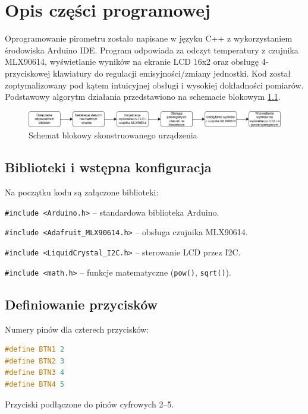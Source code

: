 \chapter{Opis części programowej}

Oprogramowanie pirometru zostało napisane w języku C++ z wykorzystaniem środowiska Arduino IDE. Program odpowiada za odczyt temperatury z czujnika MLX90614, wyświetlanie wyników na ekranie LCD 16x2 oraz obsługę 4-przyciskowej klawiatury do regulacji emisyjności/zmiany jednostki. Kod został zoptymalizowany pod kątem intuicyjnej obsługi i wysokiej dokładności pomiarów. Podstawowy algorytm działania przedstawiono na schemacie blokowym \ref{fig:blok}.

\vspace{24pt}

\begin{figure}[h!]
    \centering
    \includegraphics[width=1.1\textwidth]{images/prog.png}
    \caption{Schemat blokowy skonstruowanego urządzenia} 
    \label{fig:blok}
\end{figure}


\section{Biblioteki i wstępna konfiguracja}

Na początku kodu są załączone biblioteki:

\texttt{\#include <Arduino.h>} – standardowa biblioteka Arduino.

\texttt{\#include <Adafruit\_MLX90614.h>} – obsługa czujnika MLX90614.

\texttt{\#include <LiquidCrystal\_I2C.h>} – sterowanie LCD przez I2C.

\texttt{\#include <math.h>} – funkcje matematyczne (\texttt{pow()}, \texttt{sqrt()}).

\section*{Definiowanie przycisków}
Numery pinów dla czterech przycisków:
\begin{lstlisting}[language=C++]
#define BTN1 2
#define BTN2 3
#define BTN3 4
#define BTN4 5
\end{lstlisting}
Przyciski podłączone do pinów cyfrowych 2–5.

